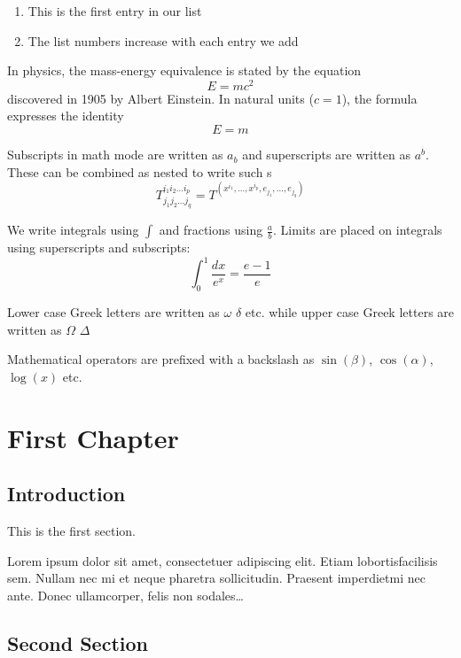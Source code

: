 \documentclass[a4paper, 14pt]{article}
\begin{document}

    \begin{enumerate}
        \item This is the first entry in our list
        \item The list numbers increase with each entry we add
    \end{enumerate}

    In physics, the mass-energy equivalence is stated by the equation \[E=mc^2\] discovered in 1905 by Albert Einstein.
    In natural units ($c = 1$), the formula expresses the identity
    \begin{equation}
        E = m
    \end{equation}

    Subscripts in math mode are written as $a_b$ and superscripts are written as $a^b$.
    These can be combined as nested to write such s
    \[ T^{i_1 i_2 \dots i_p}_{j_1 j_2 \dots j_q} = T^(x^{i_1}, \dots, x^{i_p}, e_{j_1}, \dots, e_{j_q}) \]

    We write integrals using $\int$ and fractions using $\frac{a}{b}$.
    Limits are placed on integrals using superscripts and subscripts: \[\int_0^1 \frac{dx}{e^x} = \frac{e-1}{e} \]

    Lower case Greek letters are written as $\omega$ $\delta$ etc.
    while upper case Greek letters are written as $\Omega$ $\Delta$

    Mathematical operators are prefixed with a backslash as $\sin(\beta)$, $\cos(\alpha)$, $\log(x)$ etc.


    \chapter{First Chapter}


    \section{Introduction}

    This is the first section.

    Lorem ipsum dolor sit amet, consectetuer adipiscing elit.
    Etiam lobortisfacilisis sem.
    Nullam nec mi et neque pharetra sollicitudin.
    Praesent imperdietmi nec ante.
    Donec ullamcorper, felis non sodales\ldots


    \section{Second Section}
\end{document}
